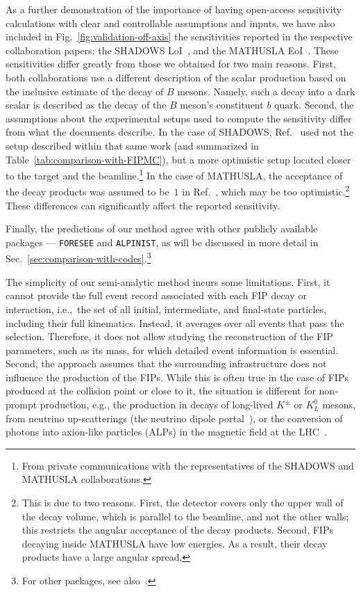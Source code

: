 \documentclass[
    aps,prd,
    twocolumn,
    nofootinbib,
    superscriptaddress,
]{revtex4}
\begin{document}
As a further demonstration of the importance of having open-access sensitivity calculations with clear and controllable assumptions and inputs, we have also included in Fig.~\ref{fig:validation-off-axis} the sensitivities reported in the respective collaboration papers: the SHADOWS LoI~\cite{Alviggi:2839484}, and the MATHUSLA EoI~\cite{MATHUSLA:2022sze}. These sensitivities differ greatly from those we obtained for two main reasons. First, both collaborations use a different description of the scalar production based on the inclusive estimate of the decay of $B$ mesons. Namely, such a decay into a dark scalar is described as the decay of the $B$ meson's constituent $b$ quark. Second, the assumptions about the experimental setups used to compute the sensitivity differ from what the documents describe. In the case of SHADOWS, Ref.~\cite{Alviggi:2839484} used not the setup described within that same work (and summarized in Table~\ref{tab:comparison-with-FIPMC}), but a more optimistic setup located closer to the target and the beamline.\footnote{From private communications with the representatives of the SHADOWS and MATHUSLA collaborations.} In the case of MATHUSLA, the acceptance of the decay products was assumed to be~$1$ in Ref.~\cite{MATHUSLA:2022sze}, which may be too optimistic.\footnote{This is due to two reasons. First, the detector covers only the upper wall of the decay volume, which is parallel to the beamline, and not the other walls; this restricts the angular acceptance of the decay products. Second, FIPs decaying inside MATHUSLA have low energies. As a result, their decay products have a large angular spread.} These differences can significantly affect the reported sensitivity.

Finally, the predictions of our method agree with other publicly available packages --- \texttt{FORESEE} and \texttt{ALPINIST}, as will be discussed in more detail in Sec.~\ref{sec:comparison-with-codes}.\footnote{For other packages, see also~\cite{Harland-Lang:2019zur,Buonocore:2018xjk,deNiverville:2016rqh}.}

The simplicity of our semi-analytic method incurs some limitations. First, it cannot provide the full event record associated with each FIP decay or interaction, i.e.,\ the set of all initial, intermediate, and final-state particles, including their full kinematics. Instead, it averages over all events that pass the selection. Therefore, it does not allow studying the reconstruction of the FIP parameters, such as its mass, for which detailed event information is essential. Second, the approach assumes that the surrounding infrastructure does not influence the production of the FIPs. While this is often true in the case of FIPs produced at the collision point or close to it, the situation is different for non-prompt production, e.g., the production in decays of long-lived $K^{\pm}$ or $K^{0}_{L}$ mesons, from neutrino up-scatterings (the neutrino dipole portal~\cite{Ovchynnikov:2022rqj,Ballett:2019bgd}), or the conversion of photons into axion-like particles (ALPs) in the magnetic field at the LHC~\cite{Kling:2022ehv}. 
\end{document}

